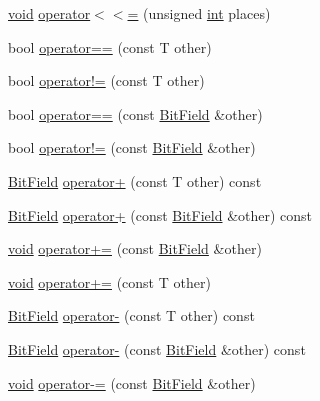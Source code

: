 \begin{DoxyCompactItemize}
\item 
\hyperlink{_s_d_l__opengles2__gl2ext_8h_ae5d8fa23ad07c48bb609509eae494c95}{void} \hyperlink{structmc_1_1_bit_field_aff70db13dd90d3b7cbdea735149745ff}{operator$<$$<$=} (unsigned \hyperlink{_s_d_l__thread_8h_a6a64f9be4433e4de6e2f2f548cf3c08e}{int} places)
\item 
bool \hyperlink{structmc_1_1_bit_field_aabeee53efa39fb42e90288606ed3ceb0}{operator==} (const T other)
\item 
bool \hyperlink{structmc_1_1_bit_field_a0bf464fa4d3c8d13cd41766f8afc74ff}{operator!=} (const T other)
\item 
bool \hyperlink{structmc_1_1_bit_field_a2b8416826b8ab4bf8aeb71a7bb31d76f}{operator==} (const \hyperlink{structmc_1_1_bit_field}{Bit\+Field} \&other)
\item 
bool \hyperlink{structmc_1_1_bit_field_ad9a3d29d969a60c4839485b4eba596d0}{operator!=} (const \hyperlink{structmc_1_1_bit_field}{Bit\+Field} \&other)
\item 
\hyperlink{structmc_1_1_bit_field}{Bit\+Field} \hyperlink{structmc_1_1_bit_field_ae73bff10ebcb9476e8772da6e05bd123}{operator+} (const T other) const 
\item 
\hyperlink{structmc_1_1_bit_field}{Bit\+Field} \hyperlink{structmc_1_1_bit_field_acf68be20c1b4720db0408e30beecbb50}{operator+} (const \hyperlink{structmc_1_1_bit_field}{Bit\+Field} \&other) const 
\item 
\hyperlink{_s_d_l__opengles2__gl2ext_8h_ae5d8fa23ad07c48bb609509eae494c95}{void} \hyperlink{structmc_1_1_bit_field_a28fb79281c7d2b5fc747e9253bcd53a5}{operator+=} (const \hyperlink{structmc_1_1_bit_field}{Bit\+Field} \&other)
\item 
\hyperlink{_s_d_l__opengles2__gl2ext_8h_ae5d8fa23ad07c48bb609509eae494c95}{void} \hyperlink{structmc_1_1_bit_field_a09e45d8ccf6c03a74fed78365447f5d0}{operator+=} (const T other)
\item 
\hyperlink{structmc_1_1_bit_field}{Bit\+Field} \hyperlink{structmc_1_1_bit_field_a4406dde6b327da7fb6d52604a7b0af9f}{operator-\/} (const T other) const 
\item 
\hyperlink{structmc_1_1_bit_field}{Bit\+Field} \hyperlink{structmc_1_1_bit_field_a5d91f80dcee8a72abb0e64530e2e073d}{operator-\/} (const \hyperlink{structmc_1_1_bit_field}{Bit\+Field} \&other) const 
\item 
\hyperlink{_s_d_l__opengles2__gl2ext_8h_ae5d8fa23ad07c48bb609509eae494c95}{void} \hyperlink{structmc_1_1_bit_field_af86d68ce2858576d85f59d73f81c7878}{operator-\/=} (const \hyperlink{structmc_1_1_bit_field}{Bit\+Field} \&other)

\end{DoxyCompactItemize}
